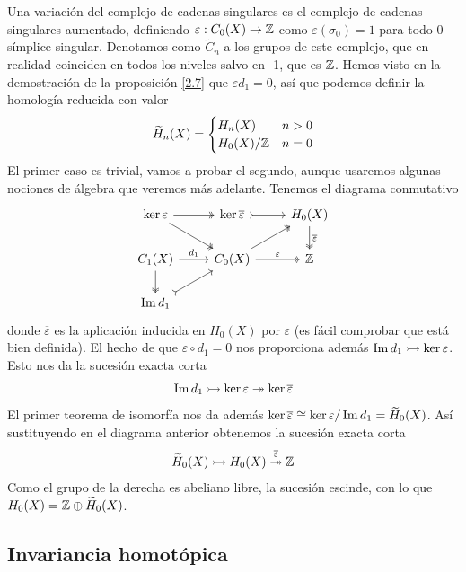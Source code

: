 \documentclass[TA.tex]{subfiles}
\begin{document}
Una variación del complejo de cadenas singulares es el complejo de cadenas singulares aumentado, definiendo $\varepsilon:C_0(X)\to \mathbb{Z}$ como $\varepsilon(\sigma_0)=1$ para todo 0-símplice singular. Denotamos como $\widetilde{C}_n$ a los grupos de este complejo, que en realidad coinciden en todos los niveles salvo en -1, que es $\mathbb{Z}$. Hemos visto en la demostración de la proposición \ref{2.7} que $\varepsilon d_1=0$, así que podemos definir la homología reducida con valor
\[
\widetilde{H}_n(X)=\begin{cases}
H_n(X) & n>0\\
H_0(X)/\mathbb{Z} & n=0
\end{cases}
\]
El primer caso es trivial, vamos a probar el segundo, aunque usaremos algunas nociones de álgebra que veremos más adelante.  Tenemos el diagrama conmutativo
\[
\begin{tikzcd}
\ker\varepsilon\arrow[rd,twoheadrightarrow]\arrow[r,twoheadrightarrow] & \ker\overline{\varepsilon}\arrow[r, rightarrowtail]& H_0(X)\arrow[d, twoheadrightarrow, "\overline{\varepsilon}"]\\
C_1(X)\arrow[r, "d_1"]\arrow[d, twoheadrightarrow] & C_0(X)\arrow[r, twoheadrightarrow, "\varepsilon"]\arrow[ur,twoheadrightarrow]  & \Z\\
\Ima{d_1}\arrow[ur, rightarrowtail]
\end{tikzcd}
\]
donde $\overline{\varepsilon}$ es la aplicación inducida en $H_0(X)$ por $\varepsilon$ (es fácil comprobar que está bien definida). El hecho de que $\varepsilon\circ d_1=0$ nos proporciona además $\operatorname{Im} d_1 \rightarrowtail\ker\varepsilon$. Esto nos da la sucesión exacta corta
\[
\operatorname{Im} d_1 \rightarrowtail\ker\varepsilon\twoheadrightarrow\ker\overline{\varepsilon}
\]
El primer teorema de isomorfía nos da además $\ker\overline{\varepsilon}\cong \ker\varepsilon/\operatorname{Im} d_1=\widetilde{H}_0(X)$. Así sustituyendo en el diagrama anterior obtenemos la sucesión exacta corta
\[
\widetilde{H}_0(X)\rightarrowtail H_0(X)\overset{\overline{\varepsilon}}{\twoheadrightarrow}\mathbb{Z}
\]
Como el grupo de la derecha es abeliano libre, la sucesión escinde, con lo que $H_0(X)=\mathbb{Z}\oplus \widetilde{H}_0(X)$.


\subsection{Invariancia homotópica}

\end{document}
